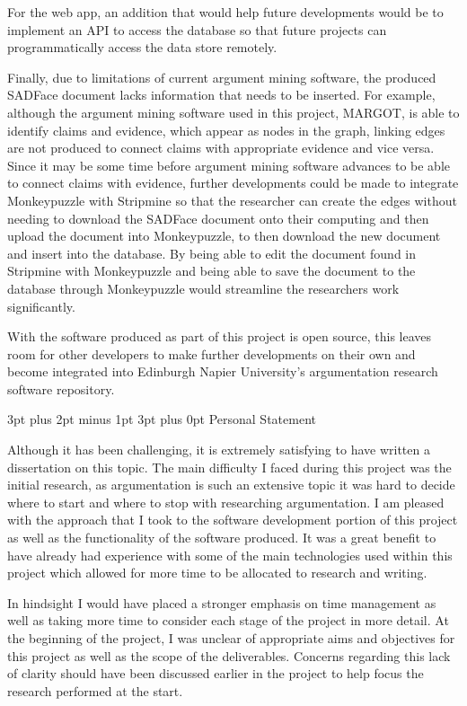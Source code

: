 \documentclass[12pt,a4paper]{article}
\makeatletter
\renewcommand\subsection{\@startsection {subsection}{1}{2mm} %
                               {3pt plus 2pt minus 1pt} %
                               {3pt plus 0pt} %
                               {\normalfont\bfseries}}
\makeatother
\begin{document}
For the web app, an addition that would help future developments would be to implement an API to access the database so that future projects can programmatically access the data store remotely.

Finally, due to limitations of current argument mining software, the produced SADFace document lacks information that needs to be inserted. For example, although the argument mining software used in this project, MARGOT, is able to identify claims and evidence, which appear as nodes in the graph, linking edges are not produced to connect claims with appropriate evidence and vice versa. Since it may be some time before argument mining software advances to be able to connect claims with evidence, further developments could be made to integrate Monkeypuzzle with Stripmine so that the researcher can create the edges without needing to download the SADFace document onto their computing and then upload the document into Monkeypuzzle, to then download the new document and insert into the database. By being able to edit the document found in Stripmine with Monkeypuzzle and being able to save the document to the database through Monkeypuzzle would streamline the researchers work significantly.

With the software produced as part of this project is open source, this leaves room for other developers to make further developments on their own and become integrated into Edinburgh Napier University's argumentation research software repository.

\subsection{Personal Statement}

Although it has been challenging, it is extremely satisfying to have written a dissertation on this topic. The main difficulty I faced during this project was the initial research, as argumentation is such an extensive topic it was hard to decide where to start and where to stop with researching argumentation. I am pleased with the approach that I took to the software development portion of this project as well as the functionality of the software produced. It was a great benefit to have already had experience with some of the main technologies used within this project which allowed for more time to be allocated to research and writing.

In hindsight I would have placed a stronger emphasis on time management as well as taking more time to consider each stage of the project in more detail. At the beginning of the project, I was unclear of appropriate aims and objectives for this project as well as the scope of the deliverables. Concerns regarding this lack of clarity should have been discussed earlier in the project to help focus the research performed at the start.
\end{document}
